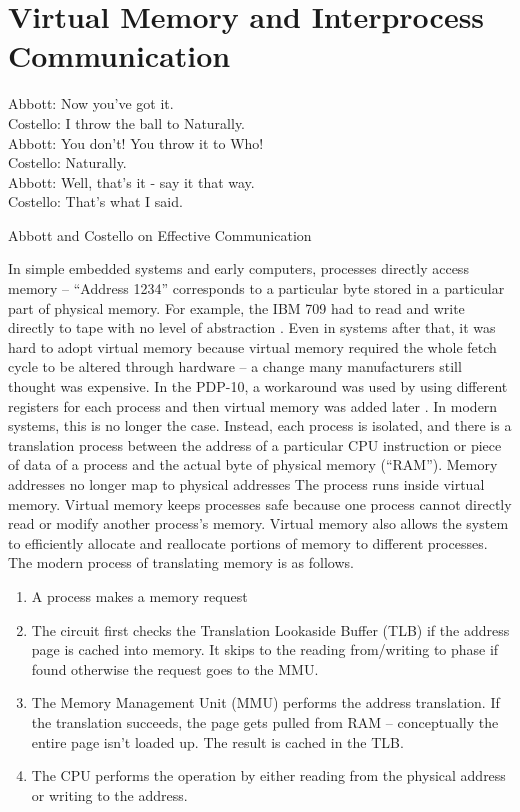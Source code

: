 \chapter{Virtual Memory and Interprocess Communication}

\epigraph{Abbott: Now you've got it. \\
Costello: I throw the ball to Naturally. \\
Abbott: You don't! You throw it to Who! \\
Costello: Naturally. \\
Abbott: Well, that's it - say it that way. \\
Costello: That's what I said.}{Abbott and Costello on Effective Communication}

In simple embedded systems and early computers, processes directly access memory -- ``Address 1234'' corresponds to a particular byte stored in a particular part of physical memory.
For example, the IBM 709 had to read and write directly to tape with no level of abstraction \cite[P. 65]{ibm709}.
Even in systems after that, it was hard to adopt virtual memory because virtual memory required the whole fetch cycle to be altered through hardware -- a change many manufacturers still thought was expensive.
In the PDP-10, a workaround was used by using different registers for each process and then virtual memory was added later \cite{ricm}.
In modern systems, this is no longer the case.
Instead, each process is isolated, and there is a translation process between the address of a particular CPU instruction or piece of data of a process and the actual byte of physical memory (``RAM'').
Memory addresses no longer map to physical addresses
The process runs inside virtual memory.
Virtual memory keeps processes safe because one process cannot directly read or modify another process's memory.
Virtual memory also allows the system to efficiently allocate and reallocate portions of memory to different processes.
The modern process of translating memory is as follows.

\begin{enumerate}
\item A process makes a memory request
\item The circuit first checks the Translation Lookaside Buffer (TLB) if the address page is cached into memory. It skips to the reading from/writing to phase if found otherwise the request goes to the MMU.
\item The Memory Management Unit (MMU) performs the address translation. If the translation succeeds, the page gets pulled from RAM -- conceptually the entire page isn't loaded up. The result is cached in the TLB.
\item The CPU performs the operation by either reading from the physical address or writing to the address.
\end{enumerate}

